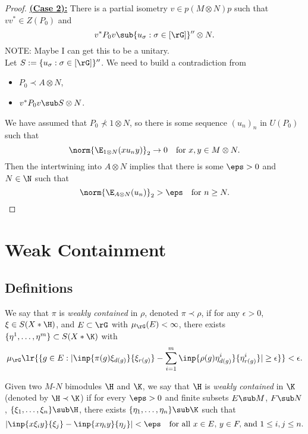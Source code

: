 \documentclass[12pt]{article}
\begin{document}
\begin{proof}
  \underline{\textbf{(Case 2):}} There is a partial isometry $ v\in p(M \otimes N) p $ such that $ vv^{*}\in Z(P_{0}) $ and 
      \[
        v^{*}P_{0} v \sub \{u_{\sigma}: \sigma\in [\rG]\}^{\prime\prime} \otimes N.
      \]
  NOTE: Maybe I can get this to be a unitary. \\

  Let $ S:= \{u_{\sigma}: \sigma\in [\rG]\}^{\prime\prime} $. We need to build a contradiction from
  \begin{itemize}
    \item $ P_{0} \prec A \otimes N $,
    \item $ v^{*}P_{0}v\sub S \otimes N $.
  \end{itemize}
  We have assumed that $ P_{0} \not\prec 1 \otimes N $, so there is some sequence $ (u_{n})_{n} $ in $ U(P_{0}) $ such that 
  \[
    \norm{\E_{1 \otimes N}(xu_{n}y)}_{2}\to0\quad \text{for }x,y\in M \otimes N.
  \]
  Then the intertwining into $ A \otimes N $ implies that there is some $ \eps>0 $ and $ N\in \N $ such that 
  \[
    \norm{\E_{A \otimes N}(u_{n})}_{2} > \eps\quad \text{for } n\geq N.
  \]






\end{proof}


\section{Weak Containment}
\subsection{Definitions}

\begin{definition}
We say that $\pi$ is {\it weakly contained} in $\rho$, denoted $\pi \prec \rho$, if for any $\epsilon > 0$, $\xi \in S(X \ast \H)$, and $E \subset \rG$ with $\mu_\rG(E) < \infty$, there exists $\{\eta^1, \dots, \eta^m\} \subset S(X \ast \K)$ with
$$
\mu_\rG\lr{\{g\in E : |\inp{ \pi(g)\xi_{d(g)}}{\xi_{r(g)}} - \sum_{i = 1}^m \inp{\rho(g)\eta^i_{d(g)}}{ \eta^i_{r(g)}} | \ge \epsilon\}} < \epsilon.
$$
\end{definition}

\begin{definition}
    Given two $M$-$N$ bimodules $ \H $ and $ \K $, we say that $ \H $ is \textit{weakly contained} in $ \K $ (denoted by $ \H \prec \K $) if for every $ \eps >0 $ and finite subsets $ E\sub M $, $ F\sub N $, $ \{ \xi_{1}, \ldots, \xi_{n}\}\sub \H $, there exists $ \{ \eta_{1},\ldots, \eta_{n}\}\sub \K $ such that 
    \[
        |\inp{x \xi_{i} y}{\xi_{j}}- \inp{x \eta_{i} y}{\eta_{j}}| < \eps \quad \text{for all }x\in E,\,y\in F,\,\text{and } 1\leq i,j\leq n.
    \]
\end{definition}
\end{document}
